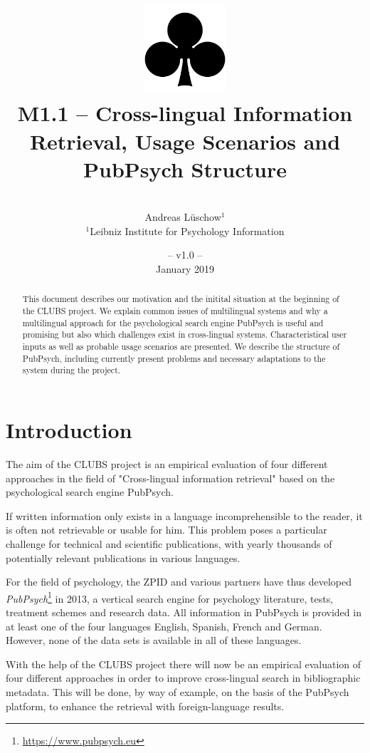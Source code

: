 \documentclass[a4paper,11pt]{article}
\title{
	\includegraphics[width=3cm]{./img/200px-SuitClubs.png} \\
	\Huge M1.1 -- Cross-lingual Information Retrieval, Usage Scenarios and PubPsych Structure\\ 
}
\author{\vspace*{1cm}\\ \LARGE Andreas Lüschow$^{1}$ \medskip \\ 
	\Large $^{1}$Leibniz Institute for Psychology Information}
\date{\vspace*{2cm} -- v1.0 --\\January 2019}
\begin{document}
\clearpage\maketitle
\thispagestyle{empty}

\vspace*{5cm}
\begin{abstract}
This document describes our motivation and the initital situation at the beginning of the CLUBS project. We explain common issues of multilingual systems and why a multilingual approach for the psychological search engine PubPsych is useful and promising but also which challenges exist in cross-lingual systems. Characteristical user inputs as well as probable usage scenarios are presented. We describe the structure of PubPsych, including currently present problems and necessary adaptations to the system during the project. 
\end{abstract}

\newpage
\tableofcontents
\clearpage

\section{Introduction}
\label{s:intro}

The aim of the CLUBS project is an empirical evaluation of four different approaches in the field of "Cross-lingual information retrieval" based on the psychological search engine PubPsych.

If written information only exists in a language incomprehensible to the reader, it is often not retrievable or usable for him. This problem poses a particular challenge for technical and scientific publications, with yearly thousands of potentially relevant publications in various languages.

For the field of psychology, the ZPID and various partners have thus developed \textit{PubPsych}\footnote{\url{https://www.pubpsych.eu}} in 2013, a vertical search engine for psychology literature, tests, treatment schemes and research data. All information in PubPsych is provided in at least one of the four languages English, Spanish, French and German. However, none of the data sets is available in all of these languages.

With the help of the CLUBS project there will now be an empirical evaluation of four different approaches in order to improve cross-lingual search in bibliographic metadata. This will be done, by way of example, on the basis of the PubPsych platform, to enhance the retrieval with foreign-language results.
\end{document}
